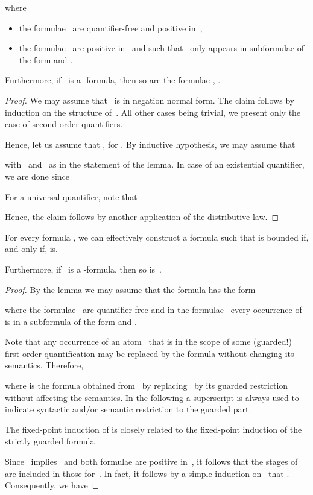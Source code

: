 \documentclass{LMCS}
\begin{document}
\begin{thm}
\begin{lem}
where
\begin{itemize}
\item the formulae~ are quantifier-free and positive in~,
\item the formulae~ are positive in~ and such that ~only appears in subformulae
  of the form  and .
\end{itemize}
Furthermore, if ~is a -formula,
then so are the formulae , .
\end{lem}
\begin{proof}
We may assume that ~is in negation normal form.
The claim follows by induction on the structure of~.
All other cases being trivial, we present only the case of second-order quantifiers.

Hence, let us assume that , for .
By inductive hypothesis, we may assume that

with ~and~ as in the statement of the lemma.
In case of an existential quantifier, we are done since

For a universal quantifier, note that

Hence, the claim follows by another application of the distributive law.
\end{proof}
\begin{prop}\label{prop: GSOg reduces to GSOgs}
For every formula ,
we can effectively construct a formula 
such that  is bounded if, and only if,  is.

Furthermore, if ~is a -formula, then so is~.
\end{prop}
\begin{proof}
By the lemma we may assume that the formula  has the form

where the formulae~ are quantifier-free
and in the formulae~ every occurrence of~ is in a subformula
of the form  and .

Note that any occurrence of an atom~ that is in the
scope of some (guarded\?!) first-order quantification may be replaced by the formula
 without changing its semantics.
Therefore,

where  is the formula obtained from~
by replacing~ by its guarded restriction~ without affecting the semantics.
In the following a superscript 
is always used to indicate syntactic and/or semantic restriction to
the guarded part.

The fixed-point induction of 
is closely related to the fixed-point induction of the strictly guarded formula


Since ~implies~ and both formulae are positive in~,
it follows that the stages of~ are included in those for~.
In fact, it follows by a simple induction on~ that
.
Consequently, we have



\end{proof}
\end{thm}
\end{document}
